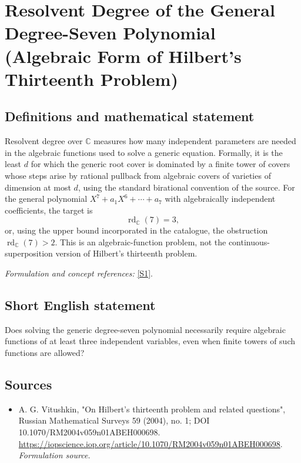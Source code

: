 \documentclass[11pt]{article}
\begin{document}
\section*{\texorpdfstring{Resolvent Degree of the General Degree-Seven Polynomial (Algebraic Form of Hilbert's Thirteenth Problem)}{Resolvent Degree of the General Degree-Seven Polynomial (Algebraic Form of Hilbert's Thirteenth Problem)}}\label{30006834}
\subsection{Definitions and mathematical statement}
Resolvent degree over ${\mathbb{C}}$ measures how many independent parameters are needed in the algebraic functions used to solve a generic equation. Formally, it is the least $d$ for which the generic root cover is dominated by a finite tower of covers whose steps arise by rational pullback from algebraic covers of varieties of dimension at most $d$, using the standard birational convention of the source. For the general polynomial
$X^7+a_1X^6+\cdots+a_7$ with algebraically independent coefficients, the target is
\[
 \operatorname{rd}_{{\mathbb{C}}}(7)=3,
\]
or, using the upper bound incorporated in the catalogue, the obstruction $\operatorname{rd}_{{\mathbb{C}}}(7)>2$. This is an algebraic-function problem, not the continuous-superposition version of Hilbert's thirteenth problem.
\par\smallskip\textit{Formulation and concept references:} \href{https://iopscience.iop.org/article/10.1070/RM2004v059n01ABEH000698}{[S1]}.

\subsection{Short English statement}
Does solving the generic degree-seven polynomial necessarily require algebraic functions of at least three independent variables, even when finite towers of such functions are allowed?
\subsection{Sources}
\begin{itemize}
\item[S1]A. G. Vitushkin, "On Hilbert's thirteenth problem and related questions", Russian Mathematical Surveys 59 (2004), no. 1; DOI 10.1070/RM2004v059n01ABEH000698.
\url{https://iopscience.iop.org/article/10.1070/RM2004v059n01ABEH000698}.
\textit{Formulation source.}
\end{itemize}
\end{document}
